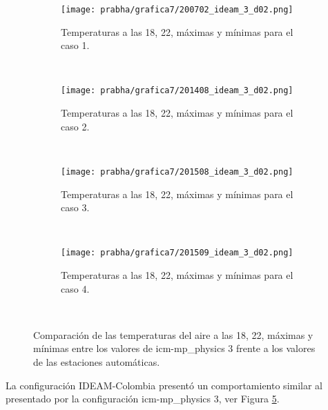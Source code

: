 \begin{figure}[H]
    \centering
    \begin{subfigure}[b]{0.45\textwidth}
        \caption{Temperaturas a las 18, 22, máximas y mínimas para el caso 1.}
	\texttt{[image: prabha/grafica7/200702\_ideam\_3\_d02.png]}
    \label{subfig:tmp_ext_caso1_d01_phy}
	\end{subfigure}
	~
	    \begin{subfigure}[b]{0.45\textwidth}
        \caption{Temperaturas a las 18, 22, máximas y mínimas para el caso 2.}
	\texttt{[image: prabha/grafica7/201408\_ideam\_3\_d02.png]}

    \label{subfig:tmp_ext_caso2_d01_phy}
	\end{subfigure}
	~
	    \begin{subfigure}[b]{0.45\textwidth}
        \caption{Temperaturas a las 18, 22, máximas y mínimas para el caso 3.}
	\texttt{[image: prabha/grafica7/201508\_ideam\_3\_d02.png]}
    \label{subfig:tmp_ext_caso3_d01_phy}
	\end{subfigure}
	~
	    \begin{subfigure}[b]{0.45\textwidth}
        \caption{Temperaturas a las 18, 22, máximas y mínimas para el caso 4.}
	\texttt{[image: prabha/grafica7/201509\_ideam\_3\_d02.png]}
    
    \label{subfig:tmp_ext_caso4_d01_phy}
	\end{subfigure}
	~

\caption{Comparación de las temperaturas del aire a las 18, 22, máximas y mínimas entre los valores de icm-mp\_physics 3 frente a los valores de las estaciones automáticas.}	
\label{subfig:tmp_ext_icmphysiscs3}	
\end{figure}


La configuración IDEAM-Colombia presentó un comportamiento similar al presentado por la configuración icm-mp\_physics 3, ver Figura \ref{subfig:tmp_ext_icmphysiscs3}.\\

